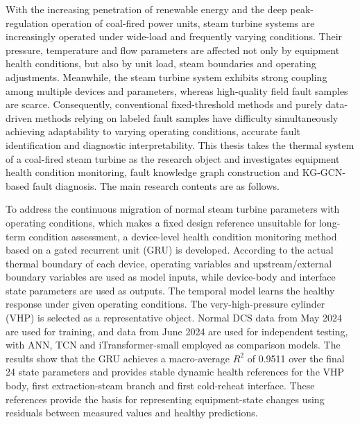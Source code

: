 \enabstracttitle

With the increasing penetration of renewable energy and the deep peak-regulation operation of coal-fired power units, steam turbine systems are increasingly operated under wide-load and frequently varying conditions. Their pressure, temperature and flow parameters are affected not only by equipment health conditions, but also by unit load, steam boundaries and operating adjustments. Meanwhile, the steam turbine system exhibits strong coupling among multiple devices and parameters, whereas high-quality field fault samples are scarce. Consequently, conventional fixed-threshold methods and purely data-driven methods relying on labeled fault samples have difficulty simultaneously achieving adaptability to varying operating conditions, accurate fault identification and diagnostic interpretability. This thesis takes the thermal system of a coal-fired steam turbine as the research object and investigates equipment health condition monitoring, fault knowledge graph construction and KG-GCN-based fault diagnosis. The main research contents are as follows.

To address the continuous migration of normal steam turbine parameters with operating conditions, which makes a fixed design reference unsuitable for long-term condition assessment, a device-level health condition monitoring method based on a gated recurrent unit (GRU) is developed. According to the actual thermal boundary of each device, operating variables and upstream/external boundary variables are used as model inputs, while device-body and interface state parameters are used as outputs. The temporal model learns the healthy response under given operating conditions. The very-high-pressure cylinder (VHP) is selected as a representative object. Normal DCS data from May 2024 are used for training, and data from June 2024 are used for independent testing, with ANN, TCN and iTransformer-small employed as comparison models. The results show that the GRU achieves a macro-average $R^2$ of 0.9511 over the final 24 state parameters and provides stable dynamic health references for the VHP body, first extraction-steam branch and first cold-reheat interface. These references provide the basis for representing equipment-state changes using residuals between measured values and healthy predictions.

